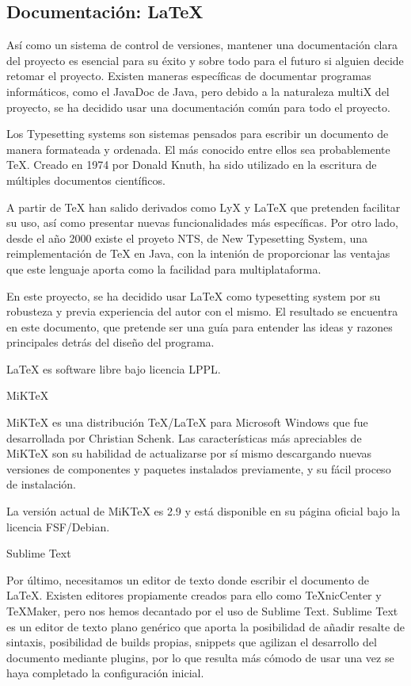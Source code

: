 \documentclass[12pt,a4paper,openright,oneside]{article}
\numberwithin{equation}{section}
\theoremstyle{definition}
\begin{document}
\subsection{Documentación: LaTeX}
Así como un sistema de control de versiones, mantener una documentación clara del proyecto es esencial para su éxito y sobre todo para el futuro si alguien decide retomar el proyecto. 
Existen maneras específicas de documentar programas informáticos, como el JavaDoc de Java, pero debido a la naturaleza multiX del proyecto, se ha decidido usar una documentación común para todo el proyecto. 

Los Typesetting systems son sistemas pensados para escribir un documento de manera formateada y ordenada. El más conocido entre ellos sea probablemente TeX. Creado en 1974 por Donald Knuth, ha sido utilizado en la escritura de múltiples documentos científicos. 

A partir de TeX han salido derivados como LyX y LaTeX que pretenden facilitar su uso, así como presentar nuevas funcionalidades más específicas. Por otro lado, desde el año 2000 existe el proyeto NTS, de New Typesetting System, una reimplementación de TeX en Java, con la intenión de proporcionar las ventajas que este lenguaje aporta como la facilidad para multiplataforma. 

En este proyecto, se ha decidido usar LaTeX como typesetting system por su robusteza y previa experiencia del autor con el mismo. El resultado se encuentra en este documento, que pretende ser una guía para entender las ideas y razones principales detrás del diseño del programa.

LaTeX es software libre bajo licencia LPPL.

MiKTeX

MiKTeX es una distribución TeX/LaTeX para Microsoft Windows que fue desarrollada por Christian Schenk. Las características más apreciables de MiKTeX son su habilidad de actualizarse por sí mismo descargando nuevas versiones de componentes y paquetes instalados previamente, y su fácil proceso de instalación.

La versión actual de MiKTeX es 2.9 y está disponible en su página oficial bajo la licencia FSF/Debian.

Sublime Text

Por último, necesitamos un editor de texto donde escribir el documento de LaTeX. Existen editores propiamente creados para ello como TeXnicCenter y TeXMaker, pero nos hemos decantado por el uso de Sublime Text. Sublime Text es un editor de texto plano genérico que aporta la posibilidad de añadir resalte de sintaxis, posibilidad de builds propias, snippets que agilizan el desarrollo del documento mediante plugins, por lo que resulta más cómodo de usar una vez se haya completado la configuración inicial.
\end{document}
